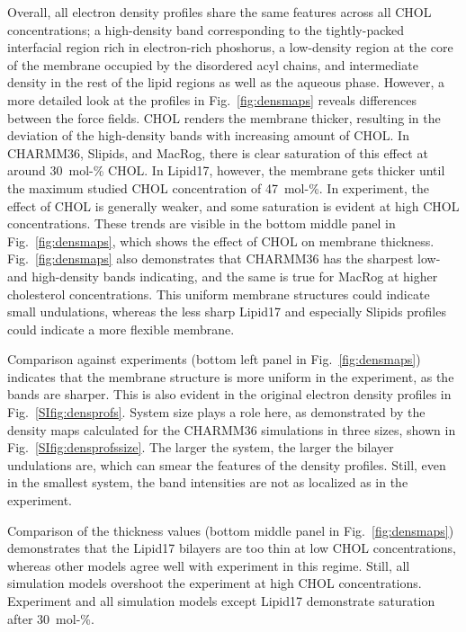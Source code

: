 \documentclass[aps,prl,superscriptaddress]{revtex4-2}
\begin{document}
Overall, all electron density profiles share the same features across all CHOL concentrations; a high-density band corresponding to the tightly-packed interfacial region rich in electron-rich phoshorus, a low-density region at the core of the membrane occupied by the disordered acyl chains, and intermediate density in the rest of the lipid regions as well as the aqueous phase. However, a more detailed look at the profiles in Fig.~\ref{fig:densmaps} reveals differences between the force fields. CHOL renders the membrane thicker, resulting in the deviation of the high-density bands with increasing amount of CHOL. In CHARMM36, Slipids, and MacRog, there is clear saturation of this effect at around 30~mol-\% CHOL. In Lipid17, however, the membrane gets thicker until the maximum studied CHOL concentration of 47~mol-\%. In experiment, the effect of CHOL is generally weaker, and some saturation is evident at high CHOL concentrations. These trends are visible in the bottom middle panel in Fig.~\ref{fig:densmaps}, which shows the effect of CHOL on membrane thickness. Fig.~\ref{fig:densmaps} also demonstrates that CHARMM36 has the sharpest low- and high-density bands indicating, and the same is true for MacRog at higher cholesterol concentrations. This uniform membrane structures could indicate small undulations, whereas the less sharp Lipid17 and especially Slipids profiles could indicate a more flexible membrane. 

Comparison against experiments (bottom left panel in Fig.~\ref{fig:densmaps}) indicates that the membrane structure is more uniform in the experiment, as the bands are sharper. This is also evident in the original electron density profiles in Fig.~\ref{SIfig:densprofs}. System size plays a role here, as demonstrated by the density maps calculated for the CHARMM36 simulations in three sizes, shown in Fig.~\ref{SIfig:densprofssize}. The larger the system, the larger the bilayer undulations are, which can smear the features of the density profiles. Still, even in the smallest system, the band intensities are not as localized as in the experiment.

Comparison of the thickness values (bottom middle panel in Fig.~\ref{fig:densmaps}) demonstrates that the Lipid17 bilayers are too thin at low CHOL concentrations, whereas other models agree well with experiment in this regime. Still, all simulation models overshoot the experiment at high CHOL concentrations. Experiment and all simulation models except Lipid17 demonstrate saturation after 30~mol-\%.
\end{document}
